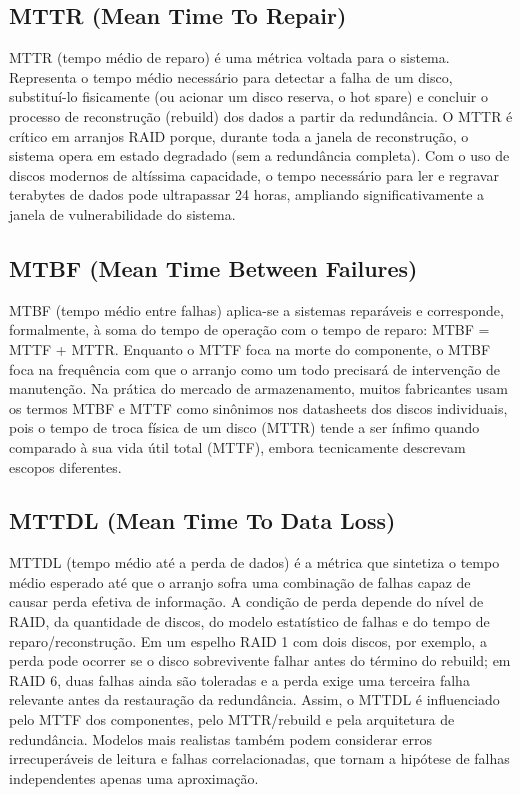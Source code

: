 \documentclass[11pt,a4paper]{article}
\begin{document}
\subsection{MTTR (Mean Time To Repair)}
MTTR (tempo médio de reparo) é uma métrica voltada para o sistema. Representa o tempo médio necessário para detectar a falha de um disco, substituí-lo fisicamente (ou acionar um disco reserva, o hot spare) e concluir o processo de reconstrução (rebuild) dos dados a partir da redundância. O MTTR é crítico em arranjos RAID porque, durante toda a janela de reconstrução, o sistema opera em estado degradado (sem a redundância completa). Com o uso de discos modernos de altíssima capacidade, o tempo necessário para ler e regravar terabytes de dados pode ultrapassar 24 horas, ampliando significativamente a janela de vulnerabilidade do sistema.

\subsection{MTBF (Mean Time Between Failures)}
MTBF (tempo médio entre falhas) aplica-se a sistemas reparáveis e corresponde, formalmente, à soma do tempo de operação com o tempo de reparo: MTBF = MTTF + MTTR. Enquanto o MTTF foca na morte do componente, o MTBF foca na frequência com que o arranjo como um todo precisará de intervenção de manutenção. Na prática do mercado de armazenamento, muitos fabricantes usam os termos MTBF e MTTF como sinônimos nos datasheets dos discos individuais, pois o tempo de troca física de um disco (MTTR) tende a ser ínfimo quando comparado à sua vida útil total (MTTF), embora tecnicamente descrevam escopos diferentes.

\subsection{MTTDL (Mean Time To Data Loss)}
MTTDL (tempo médio até a perda de dados) é a métrica que sintetiza o tempo médio esperado até que o arranjo sofra uma combinação de falhas capaz de causar perda efetiva de informação. A condição de perda depende do nível de RAID, da quantidade de discos, do modelo estatístico de falhas e do tempo de reparo/reconstrução. Em um espelho RAID 1 com dois discos, por exemplo, a perda pode ocorrer se o disco sobrevivente falhar antes do término do rebuild; em RAID 6, duas falhas ainda são toleradas e a perda exige uma terceira falha relevante antes da restauração da redundância. Assim, o MTTDL é influenciado pelo MTTF dos componentes, pelo MTTR/rebuild e pela arquitetura de redundância. Modelos mais realistas também podem considerar erros irrecuperáveis de leitura e falhas correlacionadas, que tornam a hipótese de falhas independentes apenas uma aproximação.
\end{document}
